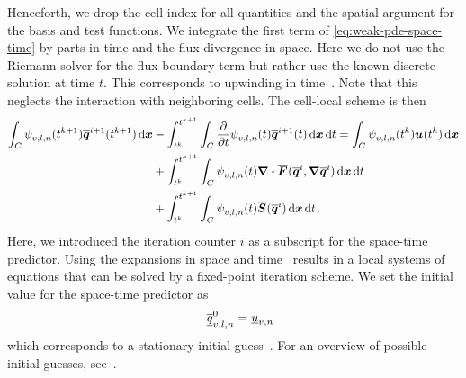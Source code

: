 Henceforth, we drop the cell index for all quantities and the spatial argument for the basis and test functions.
We integrate the first term of \cref{eq:weak-pde-space-time} by parts in time and the flux divergence in space.
Here we do not use the Riemann solver for the flux boundary term but rather use the known discrete solution at time $t$.
This corresponds to upwinding in time~\cite{dumbser2008unified}.
Note that this neglects the interaction with neighboring cells.
The cell-local scheme is then
\begin{align}\label{eq:space-time-predictor}
\begin{split}
\intdcell{
  \sttestfunction[][v,l,n] (\nextTime) \stpredictor[i+1](\nextTime)
}
&-
\intdt{\intdcell{
    \pdv{}{t} \sttestfunction[][v,l,n] (t) \stpredictor[i+1](t)
}}
= 
\intdcell{
  \sttestfunction[][v,l,n] (\curTime) \ssol (\curTime)
}
\\&+
\intdt{\intdcell{
    \sttestfunction[][v,l,n] (t) \divergence{\stflux(\stpredictor[i], \gradient{\stpredictor[i]})}
}}
\\&+
\intdt{\intdcell{
    \sttestfunction[][v,l,n] (t) \stsource(\stpredictor[i])
}}.
\end{split}
\end{align}
Here, we introduced the iteration counter $i$ as a subscript for the space-time predictor.
Using the expansions in space and time~ results in a local systems of equations that can be solved by a fixed-point iteration scheme.
We set the initial value for the space-time predictor as
\begin{equation}
  \label{eq:initial-guess}
\quad \stpredictorCoeff[0][v,l,n] = \ssolCoeff[][v,n]
\end{equation}
which corresponds to a stationary initial guess~\cite{dumbser2008unified}.
For an overview of possible initial guesses, see~\cite{dumbser2018efficient}.

